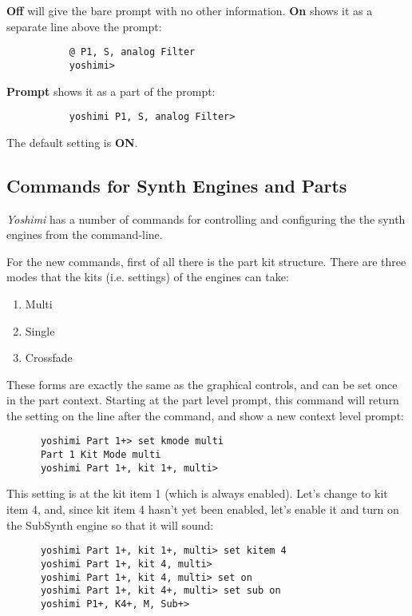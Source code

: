    \textbf{Off} will give the bare prompt with no other information.
   \textbf{On} shows it as a separate line above the prompt:

   \begin{verbatim}
           @ P1, S, analog Filter
           yoshimi>
   \end{verbatim}

   \textbf{Prompt} shows it as a part of the prompt:

   \begin{verbatim}
           yoshimi P1, S, analog Filter>
   \end{verbatim}

   The default setting is \textbf{ON}.

\subsection{Commands for Synth Engines and Parts}
\label{subsec:command_line_command_synth_engines}

   \textsl{Yoshimi} has a number of commands for controlling and
   configuring the the synth engines from the command-line.

   For the new commands, first of all there is the part kit structure.
   There are three modes that the kits (i.e. settings)
   of the engines can take:

   \begin{enumerate}
      \item Multi
      \item Single
      \item Crossfade
   \end{enumerate}

   These forms are exactly the same as the graphical controls,
   and can be set once in the part context.
   Starting at the part level prompt, this command will return the setting on
   the line after the command,
   and show a new context level prompt:

   \begin{verbatim}
      yoshimi Part 1+> set kmode multi
      Part 1 Kit Mode multi
      yoshimi Part 1+, kit 1+, multi>
   \end{verbatim}

   This setting is at the kit item 1 (which is always enabled).
   Let's change to kit item 4, and, since
   kit item 4 hasn't yet been enabled, let's enable it and turn on the
   SubSynth engine so that it will sound:

   \begin{verbatim}
      yoshimi Part 1+, kit 1+, multi> set kitem 4
      yoshimi Part 1+, kit 4, multi>
      yoshimi Part 1+, kit 4, multi> set on
      yoshimi Part 1+, kit 4+, multi> set sub on
      yoshimi P1+, K4+, M, Sub+>
   \end{verbatim}

